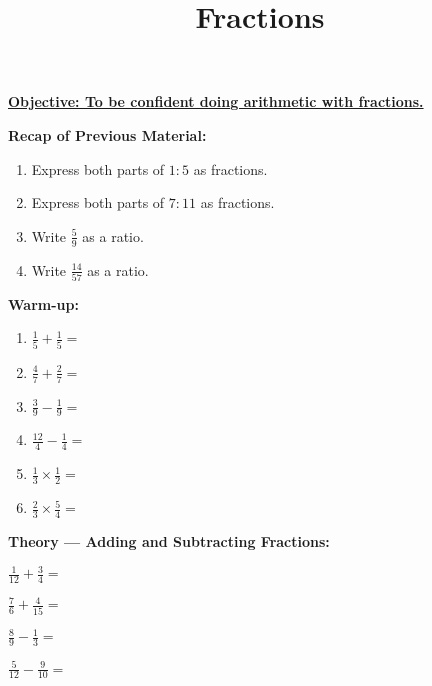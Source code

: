 \documentclass{article}
\begin{document}
\title{Fractions}
\date{}

\maketitle
\thispagestyle{empty}

\Large

\textbf{\underline{Objective: To be confident doing arithmetic with fractions.}}

\vspace{5mm}

\textbf{Recap of Previous Material:}

\vspace{5mm}

\begin{enumerate}
	\item Express both parts of $1:5$ as fractions.
	\item Express both parts of $7:11$ as fractions.
	\item Write $\frac{5}{9}$ as a ratio.
	\item Write $\frac{14}{57}$ as a ratio.
\end{enumerate}

\clearpage


\textbf{Warm-up:}

\begin{enumerate}
	\item $\frac{1}{5}+\frac{1}{5}=$
	\item $\frac{4}{7}+\frac{2}{7}=$
	\item $\frac{3}{9}-\frac{1}{9}=$
	\item $\frac{12}{4}-\frac{1}{4}=$
	\item $\frac{1}{3}\times \frac{1}{2}=$
	\item $\frac{2}{3}\times \frac{5}{4}=$
\end{enumerate}




\clearpage


{\bf Theory --- Adding and Subtracting Fractions:}

\vspace{5mm}


$\frac{1}{12} + \frac{3}{4}=$

\vfill

$\frac{7}{6}+\frac{4}{15}=$

\vfill

$\frac{8}{9}-\frac{1}{3}=$

\vfill

$\frac{5}{12}-\frac{9}{10}=$
\end{document}
